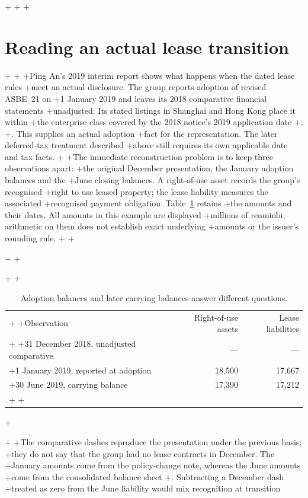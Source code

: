 +
+\clearpage
+\section{Reading an actual lease transition}
+\label{sec:pingan-lease-transition}
+
+Ping An's 2019 interim report shows what happens when the dated lease rules
+meet an actual disclosure. The group reports adoption of revised ASBE~21 on
+1 January 2019 and leaves its 2018 comparative financial statements
+unadjusted. Its stated listings in Shanghai and Hong Kong place it within
+the enterprise class covered by the 2018 notice's 2019 application date
+\citep[pp.\ 112--113]{pingan2019asbe};
+\citep[notice, para.\ I]{moflease2018}. This supplies an actual adoption
+fact for the representation. The later deferred-tax treatment described
+above still requires its own applicable date and tax facts.
+
+The immediate reconstruction problem is to keep three observations apart:
+the original December presentation, the January adoption balances and the
+June closing balances. A right-of-use asset records the group's recognised
+right to use leased property; the lease liability measures the associated
+recognised payment obligation. Table~\ref{tab:pingan-lease-balances} retains
+the amounts and their dates. All amounts in this example are displayed
+millions of renminbi; arithmetic on them does not establish exact underlying
+amounts or the issuer's rounding rule.
+
+\begin{table}[!ht]
+\centering
+\caption{Adoption balances and later carrying balances answer different questions.}
+\label{tab:pingan-lease-balances}
+\begin{tabular}{@{}lrr@{}}
+\toprule
+Observation & Right-of-use assets & Lease liabilities \\
+\midrule
+31 December 2018, unadjusted comparative & --- & --- \\
+1 January 2019, reported at adoption & 18,500 & 17,667 \\
+30 June 2019, carrying balance & 17,390 & 17,212 \\
+\bottomrule
+\end{tabular}
+\end{table}
+
+The comparative dashes reproduce the presentation under the previous basis;
+they do not say that the group had no lease contracts in December. The
+January amounts come from the policy-change note, whereas the June amounts
+come from the consolidated balance sheet
+\citep[pp.\ 99--100, 112]{pingan2019asbe}. Subtracting a December dash
+treated as zero from the June liability would mix recognition at transition
